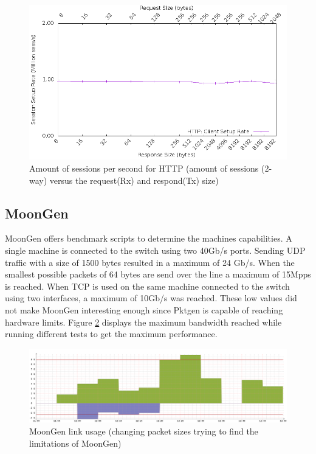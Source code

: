 \begin{figure}[H]
  \includegraphics[scale=0.6]{images/http_setup.png}
  \caption{Amount of sessions per second for HTTP (amount of sessions (2-way) versus the request(Rx) and respond(Tx) size)}
  \label{fig:httpsession}
\end{figure}


\subsection{MoonGen}
MoonGen offers benchmark scripts to determine the machines capabilities. A single machine is connected to the switch using two 40Gb/s ports. Sending UDP traffic with a size of 1500 bytes resulted in a maximum of 24 Gb/s. When the smallest possible packets of 64 bytes are send over the line a maximum of 15Mpps is reached. When TCP is used on the same machine connected to the switch using two interfaces, a maximum of 10Gb/s was reached. These low values did not make MoonGen interesting enough since Pktgen is capable of reaching hardware limits. Figure \ref{fig:moongenlink} displays the maximum bandwidth reached while running different tests to get the maximum performance. 

\begin{figure}[H]
  \includegraphics[scale=0.35]{images/moongen_link_usage.png}
  \caption{MoonGen link usage (changing packet sizes trying to find the limitations of MoonGen)}
  \label{fig:moongenlink}
\end{figure}




